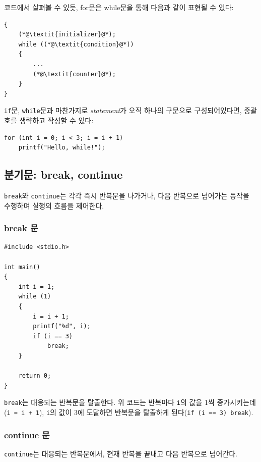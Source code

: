 \documentclass[a4paper,12pt]{book}
\newcommand{\V}[1]{\Verb|#1|}
\begin{document}
코드에서 살펴볼 수 있듯,
for문은 while문을 통해 다음과 같이 표현될 수 있다:

\begin{lstlisting}
{
    (*@\textit{initializer}@*);
    while ((*@\textit{condition}@*))
    {
        ...
        (*@\textit{counter}@*);
    }
}
\end{lstlisting}

\V{if}문, \V{while}문과 마찬가지로 \textit{statement}가
오직 하나의 구문으로 구성되어있다면,
중괄호를 생략하고 작성할 수 있다:

\begin{lstlisting}
for (int i = 0; i < 3; i = i + 1)
    printf("Hello, while!");
\end{lstlisting}


\subsection{분기문: break, continue}

\V{break}와 \V{continue}는 각각 즉시 반복문을 나가거나,
다음 반복으로 넘어가는 동작을 수행하며 실행의 흐름을 제어한다.


\subsubsection{break 문}

\begin{lstlisting}
#include <stdio.h>

int main()
{
    int i = 1;
    while (1)
    {
        i = i + 1;
        printf("%d", i);
        if (i == 3)
            break;
    }

    return 0;
}
\end{lstlisting}

\V{break}는 대응되는 반복문을 탈출한다.
위 코드는 반복마다 \V{i}의 값을 1씩 증가시키는데(\V{i = i + 1}),
\V{i}의 값이 3에 도달하면 반복문을 탈출하게 된다(\V{if (i == 3) break}).


\subsubsection{continue 문}

\V{continue}는 대응되는 반복문에서,
현재 반복을 끝내고 다음 반복으로 넘어간다.
\end{document}
